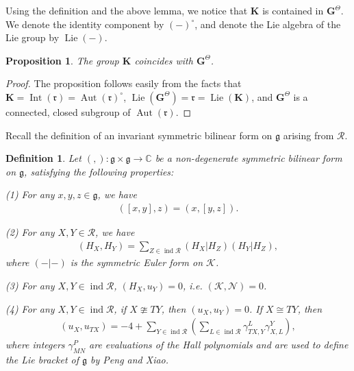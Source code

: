 \documentclass[12pt]{amsart}
\newtheorem{definition}[theorem]{Definition}
\newtheorem{proposition}[theorem]{Proposition}
\begin{document}
Using the definition and the above lemma, we notice that $\mathbf{K}$ is contained in $\mathbf{G}^{\Theta}$.
We denote the identity component by $(-)^{\circ}$, and denote the Lie algebra of the Lie group by $\operatorname{Lie}(-)$.

\begin{proposition}
    The group $\mathbf{K}$ coincides with $\mathbf{G}^{\Theta}$.
\end{proposition}

\begin{proof}
    The proposition follows easily from the facts that $\mathbf{K}=\operatorname{Int}(\mathfrak{r})=\operatorname{Aut}(\mathfrak{r})^{\circ}$, $\operatorname{Lie}(\mathbf{G}^{\Theta})=\mathfrak{r}=\operatorname{Lie}(\mathbf{K})$, and $\mathbf{G}^{\Theta}$ is a connected, closed subgroup of $\operatorname{Aut}(\mathfrak{r})$.
\end{proof}

Recall the definition of an invariant symmetric bilinear form on $\mathfrak{g}$ arising from $\mathcal{R}$.

\begin{definition}\cite[Definition 29]{notes2}\label{(,)}
Let $(,):\mathfrak{g} \times \mathfrak{g} \rightarrow \mathbb{C}$ be a non-degenerate symmetric bilinear form on $\mathfrak{g}$, satisfying the following properties:

(1) For any $x,y,z\in \mathfrak{g}$, we have 
\begin{align*}
    ([x,y],z)=(x,[y,z]).
\end{align*}
    
(2) For any $X,Y\in \mathcal{R}$, we have 
\begin{align*}
    (H_X,H_Y)=\sum_{Z\in \operatorname{ind}\mathcal{R}}(H_X|H_Z)(H_Y|H_Z),
\end{align*}
where $(-|-)$ is the symmetric Euler form on $\mathcal{K}$.

(3) For any $X,Y\in \operatorname{ind}\mathcal{R}$, $(H_X,u_Y)=0$, i.e. $(\mathcal{K},\mathcal{N})=0$.

(4) For any $X,Y\in \operatorname{ind}\mathcal{R}$, if $X\ncong TY$, then $(u_X,u_Y)=0$. 
If $X\cong TY$, then 
\begin{align*}
    (u_X,u_{TX})= -4+\sum_{Y\in\operatorname{ind}\mathcal{R}}(\sum_{L\in\operatorname{ind}\mathcal{R}} \gamma_{TX,Y}^L\gamma_{X,L}^Y),
\end{align*}
where integers $\gamma_{MN}^P$ are evaluations of the Hall polynomials and are used to define the Lie bracket of $\mathfrak{g}$ by Peng and Xiao. 
\end{definition}
\end{document}
